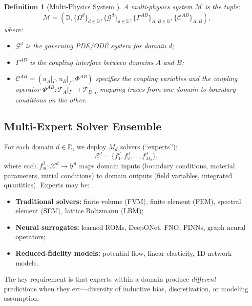 \documentclass[11pt,a4paper]{article}
\newtheorem{definition}[theorem]{Definition}
\theoremstyle{definition}
\newcommand{\domains}{\mathbb{D}}
\newcommand{\interface}{\Gamma}
\begin{document}
\begin{definition}[Multi-Physics System ]\label{def:multiphysics}
A multi-physics system $\mathcal{M}$ is the tuple:
\begin{equation}\label{eq:system}
\mathcal{M} = \left(\domains, \{\Omega^d\}_{d \in \domains}, \{\mathcal{G}^d\}_{d \in \domains}, \{\interface^{AB}\}_{A,B \in \domains}, \{\mathcal{C}^{AB}\}_{A,B}\right),
\end{equation}
where:
\begin{itemize}
    \item $\mathcal{G}^d$ is the governing PDE/ODE system for domain $d$;
    \item $\interface^{AB}$ is the coupling interface between domains $A$ and $B$;
    \item $\mathcal{C}^{AB} = (u_A|_{\interface}, u_B|_{\interface}, \Phi^{AB})$ specifies the coupling variables and the coupling operator $\Phi^{AB}: \mathcal{T}_A|_\interface \to \mathcal{T}_B|_\interface$ mapping traces from one domain to boundary conditions on the other.
\end{itemize}
\end{definition}

\subsection{Multi-Expert Solver Ensemble }

For each domain $d \in \domains$, we deploy $M_d$ solvers (``experts''):
\begin{equation}\label{eq:experts}
\mathcal{E}^d = \{f_1^d, f_2^d, \ldots, f_{M_d}^d\},
\end{equation}
where each $f_m^d: \mathcal{X}^d \to \mathcal{Y}^d$ maps domain inputs (boundary conditions, material parameters, initial conditions) to domain outputs (field variables, integrated quantities). Experts may be:

\begin{itemize}
    \item \textbf{Traditional solvers:} finite volume (FVM), finite element (FEM), spectral element (SEM), lattice Boltzmann (LBM);
    \item \textbf{Neural surrogates:} learned ROMs, DeepONet, FNO, PINNs, graph neural operators;
    \item \textbf{Reduced-fidelity models:} potential flow, linear elasticity, 1D network models.
\end{itemize}

The key requirement is that experts within a domain produce \textit{different} predictions when they err---diversity of inductive bias, discretization, or modeling assumption.
\end{document}
